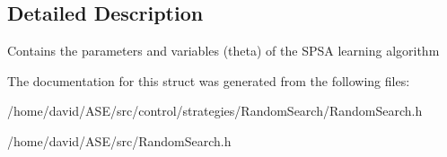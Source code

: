 \subsection{Detailed Description}
Contains the parameters and variables (theta) of the SPSA learning algorithm 

The documentation for this struct was generated from the following files:\begin{CompactItemize}
\item 
/home/david/ASE/src/control/strategies/RandomSearch/RandomSearch.h\item 
/home/david/ASE/src/RandomSearch.h\end{CompactItemize}

